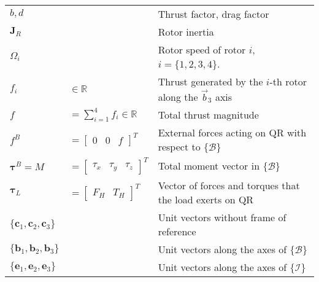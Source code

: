 \begin{tabularx}{\linewidth}{lll}
		$ b, d $ && Thrust factor, drag factor\\
		$ \mathbf{J}_R$ && Rotor inertia \\
		$ \Omega_i $ && Rotor speed of rotor $ i $, $ i=\{1,2,3,4\} $.\\	
		$ f_i $&$ \in\mathbb{R} $&Thrust generated by the $ i $-th rotor along the $ \vec{b}_3 $ axis\\	
		$ f $ &$ =\sum_{i=1}^{4}f_i \in\mathbb{R} $& Total thrust magnitude\\
		$ f^B $&$ =\begin{bmatrix} \!0 &\!\! 0&\!\! f \end{bmatrix}^T $     & External forces acting on QR with respect to $ \{\mathcal{B}\}   $                \\
		$ \boldsymbol{\tau}^B =M$&$=\begin{bmatrix} \!\tau_x &\!\! \tau_y&\!\! \tau_z \end{bmatrix}^T $     & Total moment vector in $ \{\mathcal{B}\}   $                  \\
		$ \boldsymbol{\tau}_L$&$ =\begin{bmatrix}\!F_H&\!\!T_H\end{bmatrix}^T$ &Vector of forces and torques that the load exerts on QR \\

		$ \{\mathbf{c}_1,\mathbf{c}_2,\mathbf{c}_3\} $     && Unit vectors without frame of reference\\
		$ \{\mathbf{b}_1,\mathbf{b}_2,\mathbf{b}_3\} $ && Unit vectors along the axes of $ \{\mathcal{B}\} $\\
		$ \{\mathbf{e}_1,\mathbf{e}_2,\mathbf{e}_3\} $ && Unit vectors along the axes of $ \{\mathcal{I}\} $\\

\end{tabularx}

